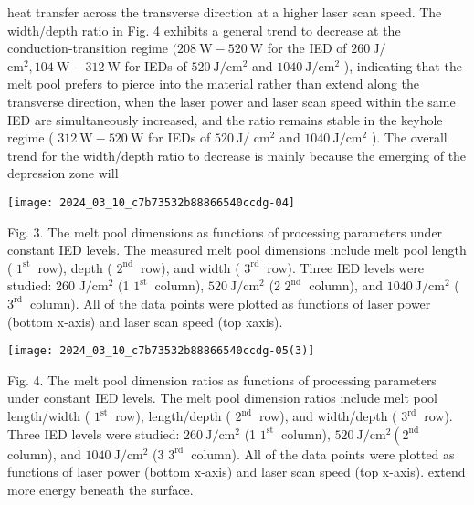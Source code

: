 \documentclass[10pt]{article}
\begin{document}
heat transfer across the transverse direction at a higher laser scan speed. The width/depth ratio in Fig. 4 exhibits a general trend to decrease at the conduction-transition regime $(208 \mathrm{~W}-520 \mathrm{~W}$ for the IED of $260 \mathrm{~J} /$ $\mathrm{cm}^{2}, 104 \mathrm{~W}-312 \mathrm{~W}$ for IEDs of $520 \mathrm{~J} / \mathrm{cm}^{2}$ and $1040 \mathrm{~J} / \mathrm{cm}^{2}$ ), indicating that the melt pool prefers to pierce into the material rather than extend along the transverse direction, when the laser power and laser scan speed within the same IED are simultaneously increased, and the ratio remains stable in the keyhole regime ( $312 \mathrm{~W}-520 \mathrm{~W}$ for IEDs of $520 \mathrm{~J} /$ $\mathrm{cm}^{2}$ and $1040 \mathrm{~J} / \mathrm{cm}^{2}$ ). The overall trend for the width/depth ratio to decrease is mainly because the emerging of the depression zone will

\begin{center}
\texttt{[image: 2024\_03\_10\_c7b73532b88866540ccdg-04]}
\end{center}

Fig. 3. The melt pool dimensions as functions of processing parameters under constant IED levels. The measured melt pool dimensions include melt pool length ( $1^{\text {st }}$ row), depth ( $2^{\text {nd }}$ row), and width ( $3^{\text {rd }}$ row). Three IED levels were studied: 260 $\mathrm{J} / \mathrm{cm}^{2}$ (1 $1^{\text {st }}$ column), $520 \mathrm{~J} / \mathrm{cm}^{2}$ (2 $2^{\text {nd }}$ column), and $1040 \mathrm{~J} / \mathrm{cm}^{2}$ ( $3^{\text {rd }}$ column). All of the data points were plotted as functions of laser power (bottom x-axis) and laser scan speed (top xaxis).

\begin{center}
\texttt{[image: 2024\_03\_10\_c7b73532b88866540ccdg-05(3)]}
\end{center}

Fig. 4. The melt pool dimension ratios as functions of processing parameters under constant IED levels. The melt pool dimension ratios include melt pool length/width ( $1^{\text {st }}$ row), length/depth ( $2^{\text {nd }}$ row), and width/depth ( $3^{\text {rd }}$ row). Three IED levels were studied: $260 \mathrm{~J} / \mathrm{cm}^{2}$ (1 $1^{\text {st }}$ column), $520 \mathrm{~J} / \mathrm{cm}^{2}\left(2^{\text {nd }}\right.$ column), and $1040 \mathrm{~J} / \mathrm{cm}^{2}$ (3 $3^{\text {rd }}$ column). All of the data points were plotted as functions of laser power (bottom $\mathrm{x}$-axis) and laser scan speed (top x-axis). extend more energy beneath the surface.
\end{document}
